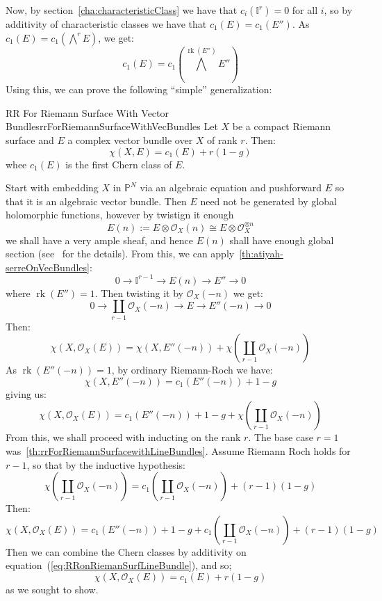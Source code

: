 \documentclass{book}
\newcommand{\BI}{{\mathbb{I}}}
\renewcommand{\P}{{\mathbb{P}}}
\newcommand{\CO}{{\mathcal{O}}}
\newcommand{\rk}{{\operatorname{rk}}}
\newcommand{\Dcup}{\coprod}
\begin{document}
Now, by section~\ref{cha:characteristicClass} we have that $c_i(\BI^r) = 0$ for all $i$, so by additivity of
characteristic classes we have that $c_1(E) = c_1(E'')$. As $c_1(E) = c_1 \left(\bigwedge^r E\right)$, we get:
\[
  c_1(E) = c_1 \left(\bigwedge^{\rk(E'')}E''\right)
\]
Using this, we can prove the following ``simple'' generalization:

\begin{thm}{RR For Riemann Surface With Vector Bundles}{rrForRiemannSurfaceWithVecBundles}
  Let $X$ be a compact Riemann surface and $E$ a complex vector bundle over $X$ of rank $r$. Then:
  \[
    \chi(X, E) = c_1(E) + r(1-g)
  \]
  whee $c_1(E)$ is the first Chern class of $E$.
\end{thm}

\begin{Proof}
  Start with embedding $X$ in $\P^N$ via an algebraic equation and pushforward $E$ so that it is an algebraic
  vector bundle. Then $E$ need not be generated by global holomorphic functions, however by twistign it enough
  \[
    E(n) := E\otimes \CO_X(n) \cong E\otimes \CO_X^{\otimes n}
  \]
  we shall have a very ample sheaf, and hence $E(n)$ shall have enough global section
  (see~\cite[section~4.4]{NateAlgGeo} for the details). From this, we can
  apply~\cref{th:atiyah-serreOnVecBundles}:
  \[
    0 \to \BI^{r-1} \to E(n) \to E'' \to 0
  \]
  where $\rk(E'') = 1$. Then twisting it by $\CO_X(-n)$ we get:
  \begin{equation}\label{eq:RRonRiemanSurfLineBundle}
    0 \to \Dcup_{r-1} \CO_X(-n) \to E \to E''(-n) \to 0
  \end{equation}
  Then:
  \[
    \chi(X, \CO_X(E)) = \chi(X, E''(-n)) + \chi \left( \Dcup_{r-1} \CO_X(-n)\right)
  \]
  As $\rk(E''(-n)) = 1$, by ordinary Riemann-Roch we have:
  \[
    \chi(X, E''(-n)) = c_1(E''(-n)) +1-g
  \]
  giving us:
  \[
    \chi(X, \CO_X(E)) = c_1(E''(-n)) +1-g  + \chi \left( \Dcup_{r-1} \CO_X(-n)\right)
  \]
  From this, we shall proceed with inducting on the rank $r$. The base case $r = 1$
  was~\cref{th:rrForRiemannSurfacewithLineBundles}. Assume Riemann Roch holds for $r-1$, so that by the
  inductive hypothesis:
  \[
    \chi \left( \Dcup_{r-1} \CO_X(-n)\right) = c_1 \left(\Dcup_{r-1} \CO_X(-n)\right) +(r-1)(1-g)
  \]
  Then:
  \[
    \chi(X, \CO_X(E)) = c_1(E''(-n)) +1-g  +c_1 \left(\Dcup_{r-1} \CO_X(-n)\right) +(r-1)(1-g)
  \]
  Then we can combine the Chern classes by additivity on equation~(\ref{eq:RRonRiemanSurfLineBundle}), and so;
  \[
    \chi(X, \CO_X(E)) = c_1(E) + r(1-g)
  \]
  as we sought to show.
\end{Proof}
\end{document}
